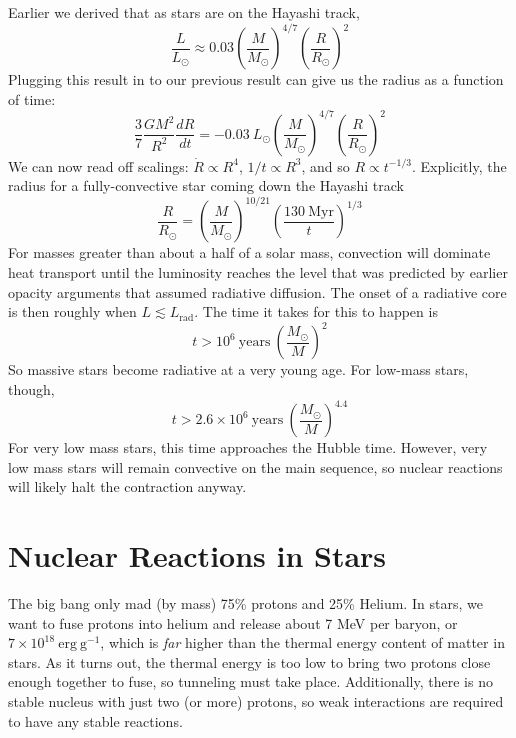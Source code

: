 \documentclass[10pt]{article}
\numberwithin{equation}{section}
\begin{document}
  Earlier we derived that as stars are on the Hayashi track,
  \begin{equation}
    \label{eq:88}
    \frac{L}{L_\odot}\approx 0.03\left(\frac{M}{M_\odot}\right)^{4/7}\left(\frac{R}{R_\odot}\right)^2
  \end{equation}
  Plugging this result in to our previous result can give us the
  radius as a function of time:
  \begin{equation}
    \label{eq:89}
    \frac{3}{7}\frac{GM^2}{R^2}\frac{dR}{dt}=-0.03\ L_\odot\left(\frac{M}{M_\odot}\right)^{4/7}\left(\frac{R}{R_\odot}\right)^2
  \end{equation}
  We can now read off scalings: $\dot{R}\propto R^4$, $1/t\propto
  R^3$, and so $R\propto t^{-1/3}$. Explicitly, the radius for a
  fully-convective star coming down the Hayashi track
  \begin{equation}
    \label{eq:90}
    \frac{R}{R_\odot}=\left(\frac{M}{M_\odot}\right)^{10/21}\left(\frac{130\ \mathrm{Myr}}{t}\right)^{1/3}
  \end{equation}
  For masses greater than about a half of a solar mass, convection
  will dominate heat transport until the luminosity reaches the level
  that was predicted by earlier opacity arguments that assumed
  radiative diffusion. The onset of a radiative core is then roughly
  when $L\lesssim L_{\mathrm{rad}}$. The time it takes for this to
  happen is
  \begin{equation}
    \label{eq:91}
    t>10^6\ \mathrm{years}\ \left(\frac{M_\odot}{M}\right)^2
  \end{equation}
  So massive stars become radiative at a very young age. For low-mass
  stars, though,
  \begin{equation}
    \label{eq:92}
    t>2.6\times 10^6\ \mathrm{years}\ \left(\frac{M_\odot}{M}\right)^{4.4}
  \end{equation}
  For very low mass stars, this time approaches the Hubble
  time. However, very low mass stars will remain convective on the
  main sequence, so nuclear reactions will likely halt the contraction
  anyway.

  \section{Nuclear Reactions in Stars}
  \label{sec:nucl-react-stars}

  The big bang only mad (by mass) 75\% protons and 25\% Helium. In
  stars, we want to fuse protons into helium and release about 7 MeV
  per baryon, or $7\times 10^18\ \mathrm{erg\ g^{-1}}$, which is
  \emph{far} higher than the thermal energy content of matter in
  stars. As it turns out, the thermal energy is too low to bring two
  protons close enough together to fuse, so tunneling must take
  place. Additionally, there is no stable nucleus with just two (or
  more) protons, so weak interactions are required to have any stable
  reactions. 
\end{document}
